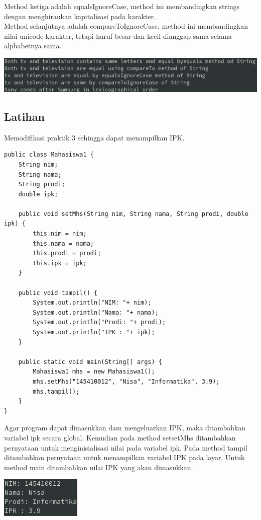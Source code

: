 \documentclass[a4paper,12pt]{article}
\begin{document}
Method ketiga adalah equalsIgnoreCase, method ini membandingkan strings dengan menghiraukan kapitalisasi pada
karakter.\\

Method selanjutnya adalah compareToIgnoreCase, method ini membandingkan nilai unicode karakter, tetapi huruf besar dan
kecil dianggap sama selama alphabetnya sama.

\begin{center}
    \includegraphics[width=.8\linewidth]{5.png} 
\end{center}

\subsection{Latihan}
Memodifikasi praktik 3 sehingga dapat menampilkan IPK.\@
\begin{lstlisting}
public class Mahasiswa1 {
    String nim;
    String nama;
    String prodi;
    double ipk;

    public void setMhs(String nim, String nama, String prodi, double ipk) {
        this.nim = nim;
        this.nama = nama;
        this.prodi = prodi;
        this.ipk = ipk;
    }

    public void tampil() {
        System.out.println("NIM: "+ nim);
        System.out.println("Nama: "+ nama);
        System.out.println("Prodi: "+ prodi);
        System.out.println("IPK : "+ ipk);
    }

    public static void main(String[] args) {
        Mahasiswa1 mhs = new Mahasiswa1();
        mhs.setMhs("145410012", "Nisa", "Informatika", 3.9);
        mhs.tampil();
    }
}
\end{lstlisting}

Agar program dapat dimasukkan dam mengeluarkan IPK, maka ditambahkan variabel ipk secara global. Kemudian pada method
setsetMhs ditambahkan pernyataan untuk menginisialisasi nilai pada variabel ipk. Pada method tampil ditambahkan
pernyataan untuk menampilkan variabel IPK pada layar. Untuk method main ditambahkan nilai IPK yang akan dimasukkan.

\begin{center}
    \includegraphics[scale=1]{6.png} 
\end{center}
\end{document}
